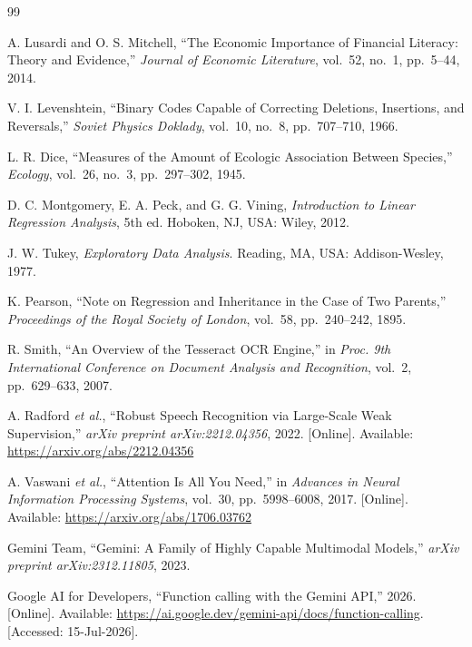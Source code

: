 \cleardoublepage
{}
{}
\begin{thebibliography}{99}

A. Lusardi and O. S. Mitchell, ``The Economic Importance of Financial Literacy: Theory and Evidence,'' \emph{Journal of Economic Literature}, vol.~52, no.~1, pp.~5--44, 2014.

V. I. Levenshtein, ``Binary Codes Capable of Correcting Deletions, Insertions, and Reversals,'' \emph{Soviet Physics Doklady}, vol.~10, no.~8, pp.~707--710, 1966.

L. R. Dice, ``Measures of the Amount of Ecologic Association Between Species,'' \emph{Ecology}, vol.~26, no.~3, pp.~297--302, 1945.

D. C. Montgomery, E. A. Peck, and G. G. Vining, \emph{Introduction to Linear Regression Analysis}, 5th ed. Hoboken, NJ, USA: Wiley, 2012.

J. W. Tukey, \emph{Exploratory Data Analysis}. Reading, MA, USA: Addison-Wesley, 1977.

K. Pearson, ``Note on Regression and Inheritance in the Case of Two Parents,'' \emph{Proceedings of the Royal Society of London}, vol.~58, pp.~240--242, 1895.

R. Smith, ``An Overview of the Tesseract OCR Engine,'' in \emph{Proc. 9th International Conference on Document Analysis and Recognition}, vol.~2, pp.~629--633, 2007.

A. Radford \emph{et al.}, ``Robust Speech Recognition via Large-Scale Weak Supervision,'' \emph{arXiv preprint arXiv:2212.04356}, 2022. [Online]. Available: \url{https://arxiv.org/abs/2212.04356}

A. Vaswani \emph{et al.}, ``Attention Is All You Need,'' in \emph{Advances in Neural Information Processing Systems}, vol.~30, pp.~5998--6008, 2017. [Online]. Available: \url{https://arxiv.org/abs/1706.03762}

Gemini Team, ``Gemini: A Family of Highly Capable Multimodal Models,'' \emph{arXiv preprint arXiv:2312.11805}, 2023.

Google AI for Developers, ``Function calling with the Gemini API,'' 2026. [Online]. Available: \url{https://ai.google.dev/gemini-api/docs/function-calling}. [Accessed: 15-Jul-2026].


\end{thebibliography}
